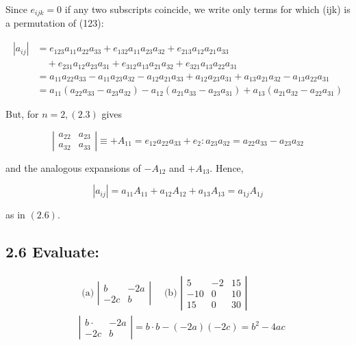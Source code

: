 \documentclass[10pt]{article}
\begin{document}
Since $e_{i j k}=0$ if any two subscripts coincide, we write only terms for which (ijk) is a permutation of (123):

$$
\begin{aligned}
\left|a_{i j}\right| & =e_{123} a_{11} a_{22} a_{33}+e_{132} a_{11} a_{23} a_{32}+e_{213} a_{12} a_{21} a_{33} \\
& \quad+e_{231} a_{12} a_{23} a_{31}+e_{312} a_{13} a_{21} a_{32}+e_{321} a_{13} a_{22} a_{31} \\
& =a_{11} a_{22} a_{33}-a_{11} a_{23} a_{32}-a_{12} a_{21} a_{33}+a_{12} a_{23} a_{31}+a_{13} a_{21} a_{32}-a_{13} a_{22} a_{31} \\
& =a_{11}\left(a_{22} a_{33}-a_{23} a_{32}\right)-a_{12}\left(a_{21} a_{33}-a_{23} a_{31}\right)+a_{13}\left(a_{21} a_{32}-a_{22} a_{31}\right)
\end{aligned}
$$

But, for $n=2,(2.3)$ gives

$$
\left|\begin{array}{ll}
a_{22} & a_{23} \\
a_{32} & a_{33}
\end{array}\right| \equiv+A_{11}=e_{12} a_{22} a_{33}+e_{2}: a_{23} a_{32}=a_{22} a_{33}-a_{23} a_{32}
$$

and the analogous expansions of $-A_{12}$ and $+A_{13}$. Hence,

$$
\left|a_{i j}\right|=a_{11} A_{11}+a_{12} A_{12}+a_{13} A_{13}=a_{1 j} A_{1 j}
$$

as in $(2.6)$.

\subsection*{2.6 Evaluate:}
$$
\begin{aligned}
& \text { (a) }\left|\begin{array}{cc}
b & -2 a \\
-2 c & b
\end{array}\right| \quad \text { (b) }\left|\begin{array}{rrr}
5 & -2 & 15 \\
-10 & 0 & 10 \\
15 & 0 & 30
\end{array}\right| \\
& \left|\begin{array}{cc}
b \cdot & -2 a \\
-2 c & b
\end{array}\right|=b \cdot b-(-2 a)(-2 c)=b^{2}-4 a c
\end{aligned}
$$
\end{document}
